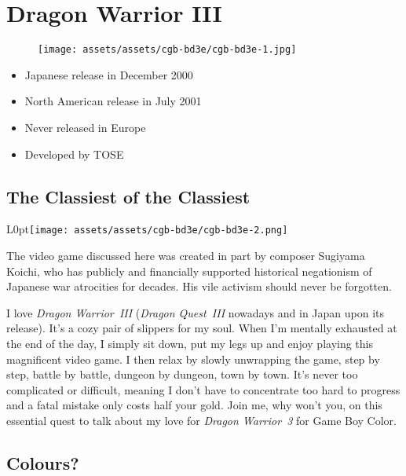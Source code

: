 \documentclass{book}
\begin{document}
\chapter*{Dragon Warrior III}
\vspace{\baselineskip}\begin{figure}[H]{\texttt{[image: assets/assets/cgb-bd3e/cgb-bd3e-1.jpg]}}\end{figure}\vspace{\baselineskip}
\begin{itemize}[left=0pt, nosep]
\item Japanese release in December 2000
\item North American release in July 2001
\item Never released in Europe
\item Developed by TOSE

\end{itemize}
\newpage\FloatBarrier\section*{The Classiest of the Classiest}
\begin{wrapfigure}{L}{0pt}{\texttt{[image: assets/assets/cgb-bd3e/cgb-bd3e-2.png]}}\end{wrapfigure}\noindent
The video game discussed here was created in part by composer Sugiyama Koichi, who has publicly and financially supported historical negationism of Japanese war atrocities for decades. His vile activism should never be forgotten.\par
I love \emph{Dragon Warrior~III} (\emph{Dragon Quest~III} nowadays and in Japan upon its release). It’s a cozy pair of slippers for my soul. When I’m mentally exhausted at the end of the day, I simply sit down, put my legs up and enjoy playing this magnificent video game. I then relax by slowly unwrapping the game, step by step, battle by battle, dungeon by dungeon, town by town. It’s never too complicated or difficult, meaning I don’t have to concentrate too hard to progress and a fatal mistake only costs half your gold. Join me, why won’t you, on this essential quest to talk about my love for \emph{Dragon Warrior~3} for Game Boy Color.\par
\FloatBarrier\section*{Colours?}
\end{document}
